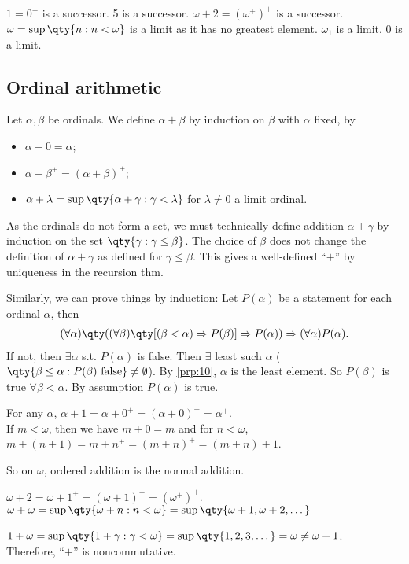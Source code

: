 \begin{example}
    $1 = 0^+$ is a successor.
    5 is a successor.
    $\omega + 2 = (\omega^+)^+$ is a successor.
    $\omega = \sup \qty{n : n < \omega}$ is a limit as it has no greatest element.
    $\omega_1$ is a limit.
    0 is a limit.
\end{example}

\subsection{Ordinal arithmetic}
Let $\alpha, \beta$ be ordinals.
We define $\alpha + \beta$ by induction on $\beta$ with $\alpha$ fixed, by
\begin{itemize}
    \item $\alpha + 0 = \alpha$;
    \item $\alpha + \beta^+ = (\alpha + \beta)^+$;
    \item $\alpha + \lambda = \sup\qty{\alpha + \gamma : \gamma < \lambda}$ for $\lambda \neq 0$ a limit ordinal.
\end{itemize}

\begin{remark}
    As the ordinals do not form a set, we must technically define addition $\alpha + \gamma$ by induction on the set $\qty{\gamma : \gamma \leq \beta}$.
    The choice of $\beta$ does not change the definition of $\alpha + \gamma$ as defined for $\gamma \leq \beta$.
    This gives a well-defined ``$+$'' by uniqueness in the recursion thm.

    Similarly, we can prove things by induction:
    Let $P(\alpha)$ be a statement for each ordinal $\alpha$, then
    \begin{align*}
        (\forall \alpha) \qty((\forall \beta) \qty[(\beta < \alpha) \implies P(\beta)] \implies P(\alpha)) \implies (\forall \alpha) P(\alpha).
    \end{align*}
    If not, then $\exists \alpha$ s.t. $P(\alpha)$ is false.
    Then $\exists$ least such $\alpha$ ($\qty{\beta \leq \alpha : P(\beta) \text{ false}} \neq \emptyset$).
    By \cref{prp:10}, $\alpha$ is the least element.
    So $P(\beta)$ is true $\forall \beta < \alpha$.
    By assumption $P(\alpha)$ is true.
\end{remark}

\begin{example}
    For any $\alpha$, $\alpha + 1 = \alpha + 0^+ = (\alpha + 0)^+ = \alpha^+$. \\
    If $m < \omega$, then we have $m + 0 = m$ and for $n < \omega$, $m + (n + 1) = m + n^+ = (m + n)^+ = (m+n) + 1$.

    So on $\omega$, ordered addition is the normal addition.

    $\omega + 2 = \omega + 1^+ = (\omega + 1)^+ = (\omega^+)^+$. \\
    $\omega + \omega = \sup \qty{\omega + n : n < \omega} = \sup\qty{\omega + 1, \omega + 2, \dots}$

    $1 + \omega = \sup\qty{1 + \gamma : \gamma < \omega} = \sup\qty{1, 2, 3, \dots} = \omega \neq \omega + 1$. \\
    Therefore, ``$+$'' is noncommutative.
\end{example}

